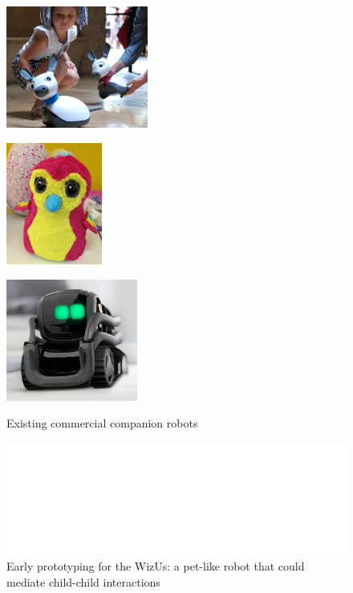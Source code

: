 \documentclass[11pt,a4paper]{report}
\newcommand{\project}{WizUs\xspace}
\begin{document}
\begin{figure}[!htbp]
    \begin{minipage}[b]{.3\linewidth}
        \centering\includegraphics[height=4cm]{figs/miro.jpg}
        \label{fig:miro}
    \end{minipage}%
    \hspace{0.1cm}
    \begin{minipage}[b]{.3\linewidth}
        \centering
        \includegraphics[height=4cm]{figs/hatchnimals.jpg}
        \label{fig:hatchimals}
    \end{minipage}%
    \hspace{0.1cm}
    \begin{minipage}[b]{.3\linewidth}
        \centering
        \includegraphics[height=4cm]{figs/anki-vector.jpg}
        \label{fig:vector}
    \end{minipage}
    \caption{Existing commercial companion robots}\label{fig:commercial-robots}
\end{figure}



\begin{figure}
    \centering
    \includegraphics[width=0.9\linewidth]{figs/wizme+dolls}
    \caption{Early prototyping for the \project: a pet-like robot that could
    mediate child-child interactions}
    \label{}
\end{figure}
\end{document}
